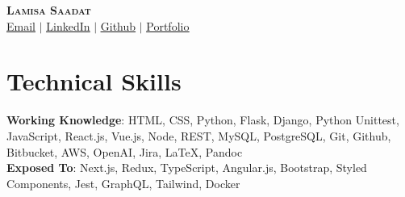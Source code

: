 \documentclass[letterpaper,11pt]{article}
\begin{document}
\begin{center}
    \textbf{\Huge \scshape Lamisa Saadat} \\ \vspace{4pt}
    \href{mailto:ls.lamisa12@gmail.com}{\underline{Email}} $|$ 
    \href{http://www.linkedin.com/in/lamisaadat}{\underline{LinkedIn}} $|$
    \href{https://github.com/LamiSaadat}{\underline{Github}} $|$
    \href{http://www.lamisaadat.com}{\underline{Portfolio}}
\end{center}

\section{Technical Skills}
 \begin{itemize}[leftmargin=0in, label={}]
    \footnotesize{\item{
     \textbf{Working Knowledge}{: HTML, CSS, Python, Flask, Django, Python Unittest, JavaScript, React.js, Vue.js, Node, REST, MySQL, PostgreSQL, Git, Github, Bitbucket, AWS, OpenAI, Jira, LaTeX, Pandoc } \\
     \vspace{4pt} 
     \textbf{Exposed To}{: Next.js, Redux, TypeScript, Angular.js, Bootstrap, Styled Components, Jest, GraphQL, Tailwind, Docker} \\ 
    }}
 \end{itemize} 

 \vspace{1pt}
\end{document}
